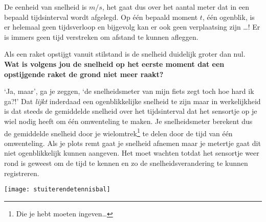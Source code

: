 \documentclass{ximera}
\begin{document}
De eenheid van snelheid is \(m/s\), het gaat dus over het aantal meter dat in een bepaald tijds\-in\-ter\-val wordt afgelegd. Op één bepaald moment \(t\), één ogenblik, is er helemaal geen tijdsverloop en bijgevolg kan er ook geen verplaatsing zijn \ldots! Er is immers geen tijd verstreken om afstand te kunnen afleggen.

\begin{denkvraag*}{}
Als een raket opstijgt vanuit stilstand is de snelheid duidelijk groter dan nul. \textbf{Wat is volgens jou de snelheid op het eerste moment dat een opstijgende raket de grond niet meer raakt?}
\end{denkvraag*}


`Ja, maar', ga je zeggen, `de snelheidsmeter van mijn fiets zegt toch hoe hard ik ga?!' Dat \textit{lijkt} inderdaad een ogenblikkelijke snelheid te zijn maar in werkelijkheid is dat steeds de gemiddelde snelheid over het tijdsinterval dat het sensortje op je wiel nodig heeft om één omwenteling te maken. Je snelheidsmeter berekent dus de gemiddelde snelheid door je wielomtrek\footnote{Die je hebt moeten ingeven\ldots} te delen door de tijd van één omwenteling. Als je plots remt gaat je snelheid afnemen maar je metertje gaat dit niet ogenblikkelijk kunnen aangeven. Het moet wachten totdat het sensortje weer rond is geweest om de tijd te kennen en zo de snelheidsverandering te kunnen registreren.
\begin{image}

\texttt{[image: stuiterendetennisbal]}
\end{image}
\end{document}
